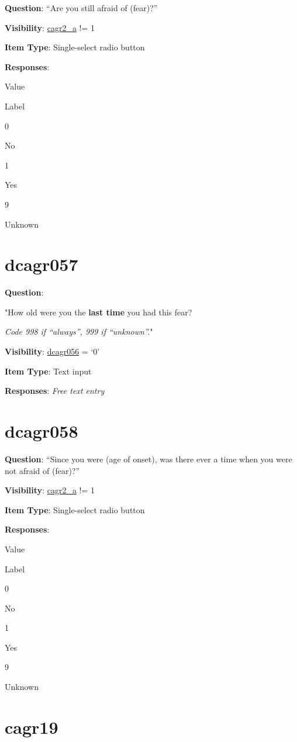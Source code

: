 \documentclass[]{book}
\begin{document}
\textbf{Question}: ``Are you still afraid of (fear)?''

\textbf{Visibility}: \protect\hyperlink{cagr2_a}{cagr2\_a} != 1

\textbf{Item Type}: Single-select radio button

\textbf{Responses}:

Value

Label

0

No

1

Yes

9

Unknown

\hypertarget{dcagr057}{%
\section{dcagr057}\label{dcagr057}}

\textbf{Question}:

"How old were you the \textbf{last time} you had this fear?

\emph{Code 998 if ``always'', 999 if ``unknown''.}"

\textbf{Visibility}: \protect\hyperlink{dcagr056}{dcagr056} = `0'

\textbf{Item Type}: Text input

\textbf{Responses}: \emph{Free text entry}

\hypertarget{dcagr058}{%
\section{dcagr058}\label{dcagr058}}

\textbf{Question}: ``Since you were (age of onset), was there ever a time when you were not afraid of (fear)?''

\textbf{Visibility}: \protect\hyperlink{cagr2_a}{cagr2\_a} != 1

\textbf{Item Type}: Single-select radio button

\textbf{Responses}:

Value

Label

0

No

1

Yes

9

Unknown

\hypertarget{cagr19}{%
\section{cagr19}\label{cagr19}}
\end{document}

